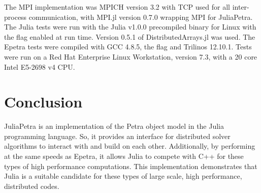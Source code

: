 \documentclass[acmsmall]{acmart}
\newcommand{\snippet}[1]{\texttt{\detokenize{#1}}}
\begin{document}
	The MPI implementation was MPICH version 3.2 with TCP used for all inter-process communication, with MPI.jl version 0.7.0 wrapping MPI for JuliaPetra.
	The Julia tests were run with the Julia v1.0.0 precompiled binary for Linux with the \snippet{-O3} flag enabled at run time.
	Version 0.5.1 of DistributedArrays.jl was used.
	The Epetra tests were compiled with GCC 4.8.5, the \snippet{-O3} flag and Trilinos 12.10.1.
	Tests were run on a Red Hat Enterprise Linux Workstation, version 7.3,
	with a 20 core Intel E5-2698 v4 CPU.
	
	\section{Conclusion}
	
	JuliaPetra is an implementation of the Petra object model in the Julia programming language.
	So, it provides an interface for distributed solver algorithms to interact with and build on each other.
	Additionally, by performing at the same speeds as Epetra,
	it allows Julia to compete with C++ for these types of high performance computations.
	This implementation demonstrates that Julia is a suitable candidate for these types of large scale, high performance, distributed codes.
	
	
	
\end{document}
